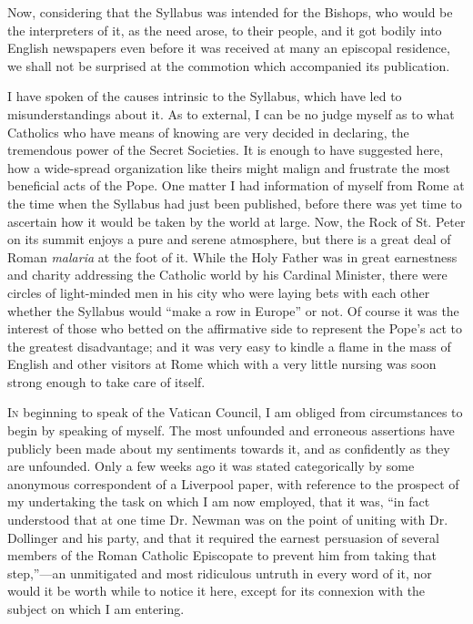 Now, considering that the Syllabus was intended for the Bishops, who
would be the interpreters of it, as the need arose, to their people, and
it got bodily into English newspapers even before it was received at
many an episcopal residence, we shall not be surprised at the commotion
which accompanied its publication.

I have spoken of the causes intrinsic to the Syllabus, which have led
to misunderstandings about it. As to external, I can be no judge myself
as to what Catholics who have means of knowing are very decided in
declaring, the tremendous power of the Secret Societies. It is enough to
have suggested here, how a wide-spread organization like theirs might
malign and frustrate the most beneficial acts of the Pope. One matter I
had information of myself from Rome at the time when the Syllabus had
just been published, before there was yet time to ascertain how it would
be taken by the world at large. Now, the Rock of St. Peter on its summit
enjoys a pure and serene atmosphere, but there is a great deal of Roman \emph{malaria}
at the foot of it. While the Holy Father was in great earnestness and
charity addressing the Catholic world by his Cardinal Minister, there
were circles of light-minded men in his city who were laying bets
with each other whether the Syllabus would ``make a row in
Europe'' or not. Of course it was the interest of those who betted
on the affirmative side to represent the Pope's act to the greatest
disadvantage; and it was very easy to kindle a flame in the mass of
English and other visitors at Rome which with a very little nursing was
soon strong enough to take care of itself.


I\textsc{n} beginning to speak of the Vatican Council, I am obliged from
circumstances to begin by speaking of myself. The most unfounded and
erroneous assertions have publicly been made about my sentiments towards
it, and as confidently as they are unfounded. Only a few weeks ago it
was stated categorically by some anonymous correspondent of a Liverpool
paper, with reference to the prospect of my undertaking the task on
which I am now employed, that it was, ``in fact understood that at
one time Dr. Newman was on the point of uniting with Dr. Dollinger and
his party, and that it required the earnest persuasion of several
members of the Roman Catholic Episcopate to prevent him from taking that
step,''—an unmitigated and most ridiculous untruth in every word
of it, nor would it be worth while to notice it here, except for its
connexion with the subject on which I am entering.

